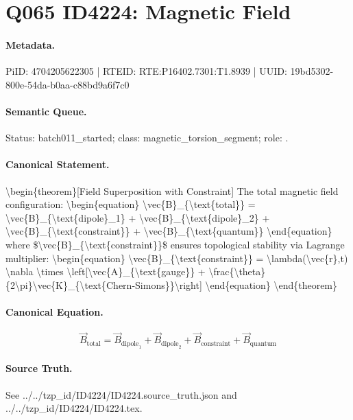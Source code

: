 \section*{Q065 ID4224: Magnetic Field}
\paragraph{Metadata.}
PiID: 4704205622305 | RTEID: RTE:P16402.7301:T1.8939 | UUID: 19bd5302-800e-54da-b0aa-c88bd9a6f7c0

\paragraph{Semantic Queue.}
Status: batch011\_started; class: magnetic\_torsion\_segment; role: .

\paragraph{Canonical Statement.}
\textbackslash{}begin\{theorem\}[Field Superposition with Constraint] The total magnetic field configuration: \textbackslash{}begin\{equation\} \textbackslash{}vec\{B\}\_\{\textbackslash{}text\{total\}\} = \textbackslash{}vec\{B\}\_\{\textbackslash{}text\{dipole\}\_1\} + \textbackslash{}vec\{B\}\_\{\textbackslash{}text\{dipole\}\_2\} + \textbackslash{}vec\{B\}\_\{\textbackslash{}text\{constraint\}\} + \textbackslash{}vec\{B\}\_\{\textbackslash{}text\{quantum\}\} \textbackslash{}end\{equation\} where \$\textbackslash{}vec\{B\}\_\{\textbackslash{}text\{constraint\}\}\$ ensures topological stability via Lagrange multiplier: \textbackslash{}begin\{equation\} \textbackslash{}vec\{B\}\_\{\textbackslash{}text\{constraint\}\} = \textbackslash{}lambda(\textbackslash{}vec\{r\},t) \textbackslash{}nabla \textbackslash{}times \textbackslash{}left[\textbackslash{}vec\{A\}\_\{\textbackslash{}text\{gauge\}\} + \textbackslash{}frac\{\textbackslash{}theta\}\{2\textbackslash{}pi\}\textbackslash{}vec\{K\}\_\{\textbackslash{}text\{Chern-Simons\}\}\textbackslash{}right] \textbackslash{}end\{equation\} \textbackslash{}end\{theorem\}

\paragraph{Canonical Equation.}
\[
\begin{equation} \vec{B}_{\text{total}} = \vec{B}_{\text{dipole}_1} + \vec{B}_{\text{dipole}_2} + \vec{B}_{\text{constraint}} + \vec{B}_{\text{quantum}} \end{equation}
\]

\paragraph{Source Truth.}
See ../../tzp\_id/ID4224/ID4224.source\_truth.json and ../../tzp\_id/ID4224/ID4224.tex.
